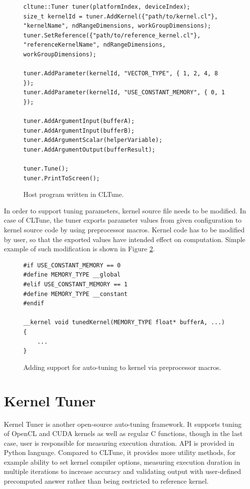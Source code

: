 \documentclass
[
    digital, %
    oneside, %
    table, %
    nolof, %
    nolot, %
    nocover %
]{fithesis3}
\begin{document}
\begin{figure}
\begin{adjustwidth}{-1cm}{-1cm}
\begin{lstlisting}
cltune::Tuner tuner(platformIndex, deviceIndex);
size_t kernelId = tuner.AddKernel({"path/to/kernel.cl"}, "kernelName", ndRangeDimensions, workGroupDimensions);
tuner.SetReference({"path/to/reference_kernel.cl"}, "referenceKernelName", ndRangeDimensions, workGroupDimensions);

tuner.AddParameter(kernelId, "VECTOR_TYPE", { 1, 2, 4, 8 });
tuner.AddParameter(kernelId, "USE_CONSTANT_MEMORY", { 0, 1 });

tuner.AddArgumentInput(bufferA);
tuner.AddArgumentInput(bufferB);
tuner.AddArgumentScalar(helperVariable);
tuner.AddArgumentOutput(bufferResult);

tuner.Tune();
tuner.PrintToScreen();
\end{lstlisting}
\caption{Host program written in CLTune.}
\label{cltune-example}
\end{adjustwidth}
\end{figure}

In order to support tuning parameters, kernel source file needs to be modified. In case of CLTune, the tuner exports parameter values from given
configuration to kernel source code by using preprocessor macros. Kernel code has to be modified by user, so that the exported values have intended
effect on computation. Simple example of such modification is shown in Figure \ref{cltune-example-kernel}.
\begin{figure}
\begin{lstlisting}
#if USE_CONSTANT_MEMORY == 0
#define MEMORY_TYPE __global
#elif USE_CONSTANT_MEMORY == 1
#define MEMORY_TYPE __constant
#endif

__kernel void tunedKernel(MEMORY_TYPE float* bufferA, ...)
{
    ...
}
\end{lstlisting}
\caption{Adding support for auto-tuning to kernel via preprocessor macros.}
\label{cltune-example-kernel}
\end{figure}

\section{Kernel Tuner}
Kernel Tuner \cite{kerneltuner} is another open-source auto-tuning framework. It supports tuning of OpenCL and CUDA kernels as well as regular C functions,
though in the last case, user is responsible for measuring execution duration. API is provided in Python language. Compared to CLTune, it provides more utility
methods, for example ability to set kernel compiler options, measuring execution duration in multiple iterations to increase accuracy and validating output
with user-defined precomputed answer rather than being restricted to reference kernel.
\end{document}
